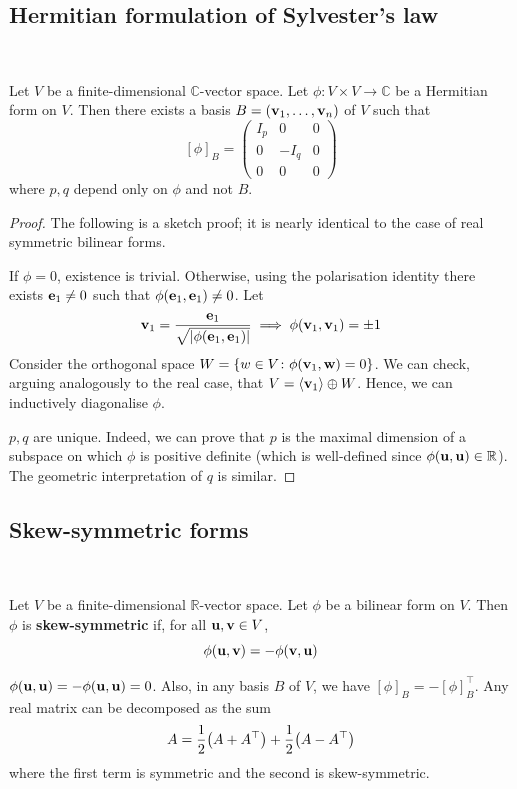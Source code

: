 \documentclass[a4paper]{article}
\begin{document}
\subsection{Hermitian formulation of Sylvester's law}
\ \vspace*{-1.5em}
\begin{theorem}
	Let \( V \) be a finite-dimensional \( \mathbb C \)-vector space.
	Let \( \phi \colon V \times V \to \mathbb C \) be a Hermitian form on \( V \).
	Then there exists a basis \( B = ({\bf v}_1, \dots, {\bf v}_n) \) of \( V \) such that
	\[
		[\phi]_B = \begin{pmatrix}
			I_p & 0    & 0 \\
			0   & -I_q & 0 \\
			0   & 0    & 0
		\end{pmatrix}
	\]
	where \( p, q \) depend only on \( \phi \) and not \( B \).
\end{theorem}
\begin{proof}
	The following is a sketch proof; it is nearly identical to the case of real symmetric bilinear forms.

	If \( \phi = 0 \), existence is trivial.
	Otherwise, using the polarisation identity there exists \( {\bf e}_1 \neq 0 \) such that \( \phi({\bf e}_1, {\bf e}_1) \neq 0 \).
	Let
	\[
		{\bf v}_1 = \frac{{\bf e}_1}{\sqrt{\abs{\phi({\bf e}_1, {\bf e}_1)}}} \implies \phi({\bf v}_1, {\bf v}_1) = \pm 1
	\]
	Consider the orthogonal space \( W = \qty{w \in V \colon \phi({\bf v}_1, {\bf w}) = 0} \).
	We can check, arguing analogously to the real case, that \( V = \left\langle{} {\bf v}_1 \right\rangle \oplus W \).
	Hence, we can inductively diagonalise \( \phi \).

	\( p, q \) are unique.
	Indeed, we can prove that \( p \) is the maximal dimension of a subspace on which \( \phi \) is positive definite (which is well-defined since \( \phi({\bf u},{\bf u}) \in \mathbb R \)).
	The geometric interpretation of \( q \) is similar.
\end{proof}

\subsection{Skew-symmetric forms}
\ \vspace*{-1.5em}
\begin{definition}
	Let \( V \) be a finite-dimensional \( \mathbb R \)-vector space.
	Let \( \phi \) be a bilinear form on \( V \).
	Then \( \phi \) is \textbf{skew-symmetric} if, for all \( {\bf u},{\bf v} \in V \),
	\[
		\phi({\bf u},{\bf v}) = -\phi({\bf v},{\bf u})
	\]
\end{definition}
\begin{remark}
	\( \phi({\bf u},{\bf u}) = -\phi({\bf u},{\bf u}) = 0 \).
	Also, in any basis \( B \) of \( V \), we have \( [\phi]_B = -[\phi]_B^\top \).
	Any real matrix can be decomposed as the sum
	\[
		A = \frac{1}{2}\qty(A + A^\top) + \frac{1}{2}\qty(A - A^\top)
	\]
	where the first term is symmetric and the second is skew-symmetric.
\end{remark}
\end{document}
